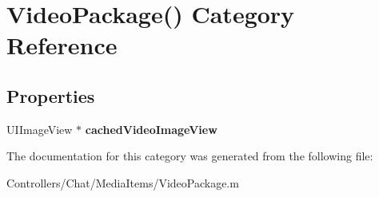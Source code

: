 \hypertarget{category_video_package_07_08}{}\section{Video\+Package() Category Reference}
\label{category_video_package_07_08}
\subsection*{Properties}
\begin{DoxyCompactItemize}
\item 
\hypertarget{category_video_package_07_08_aba2cabfc887bf8cdcef43b2dd610884a}{}U\+I\+Image\+View $\ast$ {\bfseries cached\+Video\+Image\+View}\label{category_video_package_07_08_aba2cabfc887bf8cdcef43b2dd610884a}

\end{DoxyCompactItemize}


The documentation for this category was generated from the following file\+:\begin{DoxyCompactItemize}
\item 
Controllers/\+Chat/\+Media\+Items/Video\+Package.\+m\end{DoxyCompactItemize}
